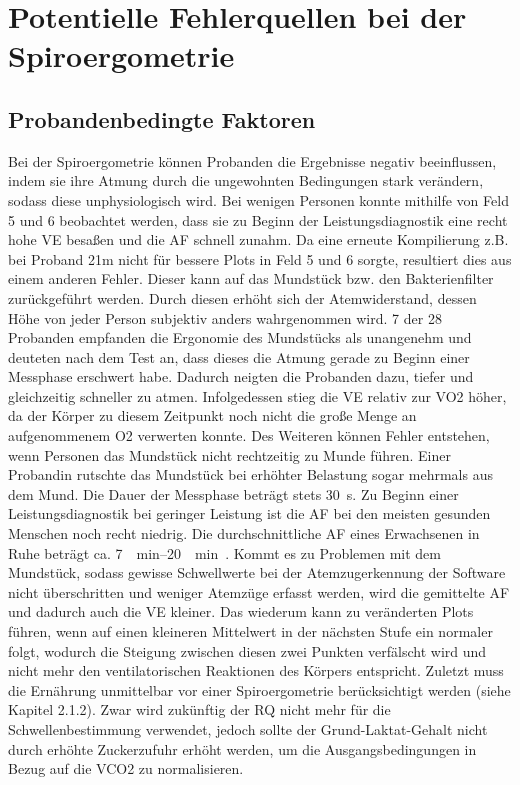 \section{Potentielle Fehlerquellen bei der Spiroergometrie}
%
\subsection{Probandenbedingte Faktoren}
%
Bei der Spiroergometrie können Probanden die Ergebnisse negativ beeinflussen, indem sie ihre Atmung durch die ungewohnten Bedingungen stark verändern, sodass diese unphysiologisch wird. Bei wenigen Personen konnte mithilfe von Feld 5 und 6 beobachtet werden, dass sie zu Beginn der Leistungsdiagnostik eine recht hohe \gls{VE} besaßen und die \gls{AF} schnell zunahm. Da eine erneute Kompilierung z.B. bei Proband 21m nicht für bessere Plots in Feld 5 und 6 sorgte, resultiert dies aus einem anderen Fehler. Dieser kann auf das Mundstück bzw. den Bakterienfilter zurückgeführt werden. Durch diesen erhöht sich der Atemwiderstand, dessen Höhe von jeder Person subjektiv anders wahrgenommen wird. 7 der 28 Probanden empfanden die Ergonomie des Mundstücks als unangenehm und deuteten nach dem Test an, dass dieses die Atmung gerade zu Beginn einer Messphase erschwert habe. Dadurch neigten die Probanden dazu, tiefer und gleichzeitig schneller zu atmen. Infolgedessen stieg die \gls{VE} relativ zur \gls{VO2} höher, da der Körper zu diesem Zeitpunkt noch nicht die große Menge an aufgenommenem \gls{O2} verwerten konnte. Des Weiteren können Fehler entstehen, wenn Personen das Mundstück nicht rechtzeitig zu Munde führen. Einer Probandin rutschte das Mundstück bei erhöhter Belastung sogar mehrmals aus dem Mund. Die Dauer der Messphase beträgt stets \SI{30}{\second}. Zu Beginn einer Leistungsdiagnostik bei geringer Leistung ist die \gls{AF} bei den meisten gesunden Menschen noch recht niedrig. Die durchschnittliche \gls{AF} eines Erwachsenen in Ruhe beträgt ca. \SIrange{7}{20}{\per\minute}~\cite{Larsen.2017}. Kommt es zu Problemen mit dem Mundstück, sodass gewisse Schwellwerte bei der Atemzugerkennung der Software nicht überschritten und weniger Atemzüge erfasst werden, wird die gemittelte \gls{AF} und dadurch auch die \gls{VE} kleiner. Das wiederum kann zu veränderten Plots führen, wenn auf einen kleineren Mittelwert in der nächsten Stufe ein normaler folgt, wodurch die Steigung zwischen diesen zwei Punkten verfälscht wird und nicht mehr den ventilatorischen Reaktionen des Körpers entspricht. Zuletzt muss die Ernährung unmittelbar vor einer Spiroergometrie berücksichtigt werden (siehe Kapitel 2.1.2). Zwar wird zukünftig der RQ nicht mehr für die Schwellenbestimmung verwendet, jedoch sollte der Grund-Laktat-Gehalt nicht durch erhöhte Zuckerzufuhr erhöht werden, um die Ausgangsbedingungen in Bezug auf die \gls{VCO2} zu normalisieren.
%
